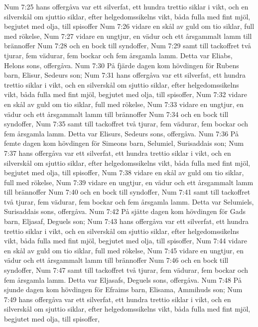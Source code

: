 Num 7:25  hans offergåva var ett silverfat, ett hundra trettio siklar i vikt, och en silverskål om sjuttio siklar, efter helgedomssikelns vikt, båda fulla med fint mjöl, begjutet med olja, till spisoffer
Num 7:26  vidare en skål av guld om tio siklar, full med rökelse,
Num 7:27  vidare en ungtjur, en vädur och ett årsgammalt lamm till brännoffer
Num 7:28  och en bock till syndoffer,
Num 7:29  samt till tackoffret två tjurar, fem vädurar, fem bockar och fem årsgamla lamm. Detta var Eliabs, Helons sons, offergåva.
Num 7:30  På fjärde dagen kom hövdingen för Rubens barn, Elisur, Sedeurs son;
Num 7:31  hans offergåva var ett silverfat, ett hundra trettio siklar i vikt, och en silverskål om sjuttio siklar, efter helgedomssikelns vikt, båda fulla med fint mjöl, begjutet med olja, till spisoffer,
Num 7:32  vidare en skål av guld om tio siklar, full med rökelse,
Num 7:33  vidare en ungtjur, en vädur och ett årsgammalt lamm till brännoffer
Num 7:34  och en bock till syndoffer,
Num 7:35  samt till tackoffret två tjurar, fem vädurar, fem bockar och fem årsgamla lamm. Detta var Elisurs, Sedeurs sons, offergåva.
Num 7:36  På femte dagen kom hövdingen för Simeons barn, Selumiel, Surisaddais son;
Num 7:37  hans offergåva var ett silverfat, ett hundra trettio siklar i vikt, och en silverskål om sjuttio siklar, efter helgedomssikelns vikt, båda fulla med fint mjöl, begjutet med olja, till spisoffer,
Num 7:38  vidare en skål av guld om tio siklar, full med rökelse,
Num 7:39  vidare en ungtjur, en vädur och ett årsgammalt lamm till brännoffer
Num 7:40  och en bock till syndoffer,
Num 7:41  samt till tackoffret två tjurar, fem vädurar, fem bockar och fem årsgamla lamm. Detta var Selumiels, Surisaddais sons, offergåva.
Num 7:42  På sjätte dagen kom hövdingen för Gads barn, Eljasaf, Deguels son;
Num 7:43  hans offergåva var ett silverfat, ett hundra trettio siklar i vikt, och en silverskål om sjuttio siklar, efter helgedomssikelns vikt, båda fulla med fint mjöl, begjutet med olja, till spisoffer,
Num 7:44  vidare en skål av guld om tio siklar, full med rökelse,
Num 7:45  vidare en ungtjur, en vädur och ett årsgammalt lamm till brännoffer
Num 7:46  och en bock till syndoffer,
Num 7:47  samt till tackoffret två tjurar, fem vädurar, fem bockar och fem årsgamla lamm. Detta var Eljasafs, Deguels sons, offergåva.
Num 7:48  På sjunde dagen kom hövdingen för Efraims barn, Elisama, Ammihuds son;
Num 7:49  hans offergåva var ett silverfat, ett hundra trettio siklar i vikt, och en silverskål om sjuttio siklar, efter helgedomssikelns vikt, båda fulla med fint mjöl, begjutet med olja, till spisoffer,
